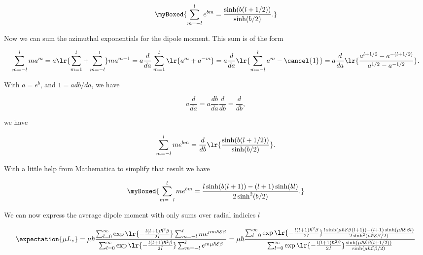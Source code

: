 {\begin{equation}\label{eqn:basicStatMechProblemSet5Problem3:440}
\myBoxed{
\sum_{m = -l}^l e^{b m}
=
\frac{
\sinh(b(l + 1/2))
}
{
\sinh(b/2)
}.
}
\end{equation}

Now we can sum the azimuthal exponentials for the dipole moment.  This sum is of the form

\begin{dmath}\label{eqn:basicStatMechProblemSet5Problem3:460}
\sum_{m = -l}^l m a^m
= a 
\lr{ \sum_{m = 1}^l + \sum_{m = -l}^{-1} }
m a^{m-1}
= a 
\frac{d}{da}
\sum_{m = 1}^l
\lr{ a^{m} + a^{-m} }
= 
a 
\frac{d}{da}
\lr{ \sum_{m = -l}^l a^m - \cancel{1} }
= 
a 
\frac{d}{da}
\lr{ \frac{a^{l + 1/2} - a^{-(l+1/2)}}{a^{1/2} - a^{-1/2}} }.
\end{dmath}

With $a = e^{b}$, and $1 = a db/da$, we have

\begin{equation}\label{eqn:basicStatMechProblemSet5Problem3:480}
a \frac{d}{da} = a \frac{db}{da} \frac{d}{db} = \frac{d}{db},
\end{equation}

we have

\begin{equation}\label{eqn:basicStatMechProblemSet5Problem3:500}
\sum_{m = -l}^l m e^{b m}
= \frac{d}{db}
\lr{
\frac{
\sinh(b(l + 1/2))
}{
\sinh(b/2)
}
}.
\end{equation}

With a little help from Mathematica to simplify that result we have

\begin{equation}\label{eqn:basicStatMechProblemSet5Problem3:520}
\myBoxed{
\sum_{m = -l}^l m e^{b m}
=
\frac
{
l \sinh(b (l+1)) - (l+1) \sinh(b l) 
}
{
2 \sinh^2(b/2)
}
.
}
\end{equation}

We can now express the average dipole moment with only sums over radial indicies $l$ 

\begin{dmath}\label{eqn:basicStatMechProblemSet5Problem3:540}
\expectation{ \mu L_z } 
= 
\mu \hbar 
\frac{
   \sum_{l = 0}^\infty \exp\lr{ -\frac{l (l+1) \hbar^2 \beta}{2 I}}
   \sum_{m = -l}^l m e^{ \mu m \hbar \mathcal{E} \beta}
}
{
   \sum_{l = 0}^\infty \exp\lr{ -\frac{l (l+1) \hbar^2 \beta}{2 I}} 
   \sum_{m = -l}^l e^{ m \mu \hbar \mathcal{E} \beta}
}
=
\mu \hbar
\frac
{
   \sum_{l = 0}^\infty \exp\lr{ -\frac{l (l+1) \hbar^2 \beta}{2 I}}
   \frac
   {
      l \sinh(\mu \hbar \mathcal{E} \beta (l+1)) - (l+1) \sinh(\mu \hbar \mathcal{E} \beta l) 
   }
   {
      2 \sinh^2(\mu \hbar \mathcal{E} \beta/2)
   }
}
{
\sum_{l = 0}^\infty \exp\lr{ -\frac{l (l+1) \hbar^2 \beta}{2 I}} 
   \frac
   {
      \sinh(\mu \hbar \mathcal{E} \beta(l + 1/2))
   }
   {
      \sinh(\mu \hbar \mathcal{E} \beta/2)
   }
}
\end{dmath}

}
